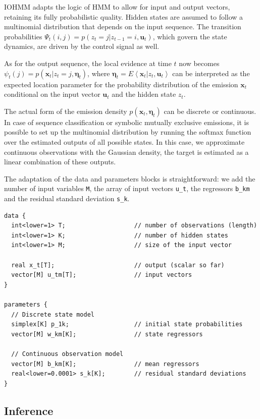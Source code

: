 \documentclass[]{article}
\newcommand\ev[1]{E\left\langle#1\right\rangle}
\newcommand{\mat}[1]{\mathbf{#1}}
\begin{document}
IOHMM adapts the logic of HMM to allow for input and output vectors,
retaining its fully probabilistic quality. Hidden states are assumed to
follow a multinomial distribution that depends on the input sequence.
The transition probabilities
\(\Psi_t(i, j) = p(z_t = j | z_{t-1} = i, \mat{u}_{t})\), which govern
the state dynamics, are driven by the control signal as well.

As for the output sequence, the local evidence at time \(t\) now becomes
\(\psi_t(j) = p(\mat{x}_t | z_t = j, \mat{\eta}_t)\), where
\(\mat{\eta}_t = \ev{\mat{x}_t | z_t, \mat{u}_t}\) can be interpreted as
the expected location parameter for the probability distribution of the
emission \(\mat{x}_{t}\) conditional on the input vector \(\mat{u}_t\)
and the hidden state \(z_t\).

The actual form of the emission density \(p(\mat{x}_t, \mat{\eta}_t)\)
can be discrete or continuous. In case of sequence classification or
symbolic mutually exclusive emissions, it is possible to set up the
multinomial distribution by running the softmax function over the
estimated outputs of all possible states. In this case, we approximate
continuous observations with the Gaussian density, the target is
estimated as a linear combination of these outputs.

The adaptation of the data and parameters blocks is straightforward: we
add the number of input variables \texttt{M}, the array of input vectors
\texttt{u\_t}, the regressors \texttt{b\_km} and the residual standard
deviation \texttt{s\_k}.

\begin{verbatim}
data {
  int<lower=1> T;                   // number of observations (length)
  int<lower=1> K;                   // number of hidden states
  int<lower=1> M;                   // size of the input vector

  real x_t[T];                      // output (scalar so far)
  vector[M] u_tm[T];                // input vectors
}

parameters {
  // Discrete state model
  simplex[K] p_1k;                  // initial state probabilities
  vector[M] w_km[K];                // state regressors

  // Continuous observation model
  vector[M] b_km[K];                // mean regressors
  real<lower=0.0001> s_k[K];        // residual standard deviations
}
\end{verbatim}

\subsection{Inference}\label{inference-1}
\end{document}
